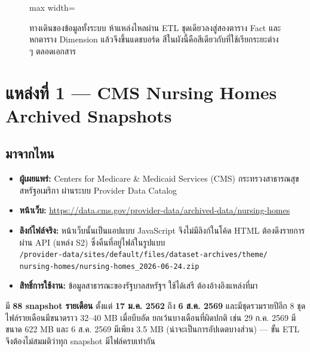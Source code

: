 \documentclass[11pt,a4paper]{article}
\newcommand{\en}[1]{#1}
\newcommand{\code}[1]{\texttt{#1}}
\begin{document}
\begin{figure}[H]
\begin{adjustbox}{max width=\linewidth}
\end{adjustbox}
\caption{ทางเดินของข้อมูลทั้งระบบ ห้าแหล่งไหลผ่าน ETL ชุดเดียวลงสู่สองตาราง Fact และหกตาราง Dimension แล้วจึงขึ้นแดชบอร์ด สีในผังนี้คือสีเดียวกับที่ใช้เรียกระยะต่าง ๆ ตลอดเอกสาร}
\end{figure}

\section{แหล่งที่ 1 --- CMS Nursing Homes Archived Snapshots}

\subsection{มาจากไหน}
\begin{itemize}
\item \textbf{ผู้เผยแพร่:} Centers for Medicare \& Medicaid Services (CMS)
      กระทรวงสาธารณสุขสหรัฐอเมริกา ผ่านระบบ \en{Provider Data Catalog}
\item \textbf{หน้าเว็บ:} \url{https://data.cms.gov/provider-data/archived-data/nursing-homes}
\item \textbf{ลิงก์ไฟล์จริง:} หน้าเว็บนั้นเป็นแอปแบบ \en{JavaScript} จึงไม่มีลิงก์ในโค้ด HTML
      ต้องดึงรายการผ่าน API (แหล่ง S2) ซึ่งคืนที่อยู่ไฟล์ในรูปแบบ \\
      \code{/provider-data/sites/default/files/dataset-archives/theme/} \\
      \code{nursing-homes/nursing-homes_2026-06-24.zip}
\item \textbf{สิทธิ์การใช้งาน:} ข้อมูลสาธารณะของรัฐบาลสหรัฐฯ ใช้ได้เสรี ต้องอ้างอิงแหล่งที่มา
\end{itemize}

\begin{goodbox}[title={สิ่งที่ตรวจแล้วเกี่ยวกับแหล่งนี้}]
มี \textbf{88 snapshot รายเดือน} ตั้งแต่ \textbf{17 ม.ค. 2562} ถึง \textbf{6 ส.ค. 2569}
และมีชุดรวมรายปีอีก 8 ชุด ไฟล์รายเดือนมีขนาดราว 32--40 MB เมื่อบีบอัด
ยกเว้นบางเดือนที่ผิดปกติ เช่น 29 ก.ค. 2569 มีขนาด 622 MB และ 6 ส.ค. 2569 มีเพียง 3.5 MB
(น่าจะเป็นการอัปเดตบางส่วน) --- ขั้น ETL จึงต้องไม่สมมติว่าทุก snapshot มีไฟล์ครบเท่ากัน
\end{goodbox}
\end{document}
